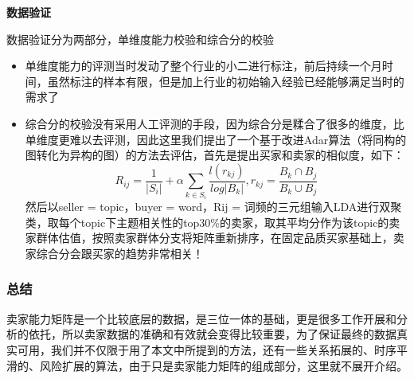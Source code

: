 \textbf{数据验证}

数据验证分为两部分，单维度能力校验和综合分的校验 
\begin{itemize}
\item
单维度能力的评测当时发动了整个行业的小二进行标注，前后持续一个月时间，虽然标注的样本有限，但是加上行业的初始输入经验已经能够满足当时的需求了

\item
综合分的校验没有采用人工评测的手段，因为综合分是糅合了很多的维度，比单维度更难以去评测，因此这里我们提出了一个基于改进Adar算法（将同构的图转化为异构的图）的方法去评估，首先是提出买家和卖家的相似度，如下：
\begin{equation}
R_{ij}=\frac{1}{\vert S_{i} \vert}+\alpha \sum_{k\in S_{i}}\frac{l(r_{kj})}{log\vert B_{k}\vert},r_{kj}=\frac{B_{k}\cap B_{j}}{B_{k}\cup B_{j}}
\end{equation}
然后以seller = topic，buyer = word，Rij =
词频的三元组输入LDA进行双聚类，取每个topic下主题相关性的top30\%的卖家，取其平均分作为该topic的卖家群体估值，按照卖家群体分支将矩阵重新排序，在固定品质买家基础上，卖家综合分会跟买家的趋势非常相关！
\end{itemize}

\subsubsection{总结}\label{ux603bux7ed3ux4e0eux5c55ux671b}

卖家能力矩阵是一个比较底层的数据，是三位一体的基础，更是很多工作开展和分析的依托，所以卖家数据的准确和有效就会变得比较重要，为了保证最终的数据真实可用，我们并不仅限于用了本文中所提到的方法，还有一些关系拓展的、时序平滑的、风险扩展的算法，由于只是卖家能力矩阵的组成部分，这里就不展开介绍。



